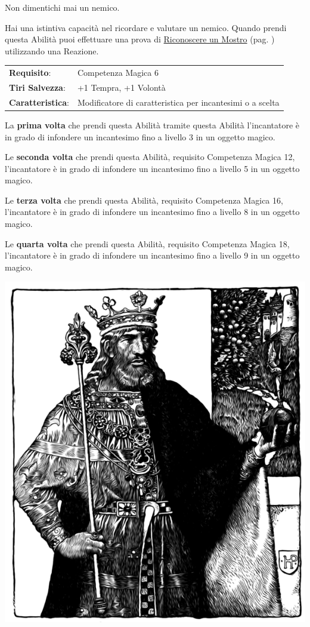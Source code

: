 \begin{multicols}{2}
Non dimentichi mai un nemico.

Hai una istintiva capacità nel ricordare e valutare un nemico. Quando prendi questa Abilità puoi effettuare una prova di \hyperlink{riconoscereimostri}{Riconoscere un Mostro} (pag. \pageref{riconoscereimostri}) utilizzando una Reazione.


\hspace{-0.2cm}\begin{tabularx}{\linewidth}{l@{\hspace{8pt}}X}
\rowcolor{gray!20}\textbf{Requisito}: & Competenza Magica 6\\
\textbf{Tiri Salvezza}: & +1 Tempra, +1 Volontà\\
\rowcolor{gray!20}\textbf{Caratteristica}: & Modificatore di caratteristica per incantesimi o a scelta\\
\end{tabularx}\smallskip

La \textbf{prima volta} che prendi questa Abilità tramite questa Abilità l'incantatore è in grado di infondere un incantesimo fino a livello 3 in un oggetto magico.

Le \textbf{seconda volta} che prendi questa Abilità, requisito Competenza Magica 12, l'incantatore è in grado di infondere un incantesimo fino a livello 5 in un oggetto magico.

Le \textbf{terza volta} che prendi questa Abilità, requisito Competenza Magica 16, l'incantatore è in grado di infondere un incantesimo fino a livello 8 in un oggetto magico.

Le \textbf{quarta volta} che prendi questa Abilità, requisito Competenza Magica 18, l'incantatore è in grado di infondere un incantesimo fino a livello 9 in un oggetto magico.


\begin{center}
	\includegraphics[width=0.8\linewidth]{immagini/oggettimagiciuomo.png}


\end{center}
\end{multicols}
